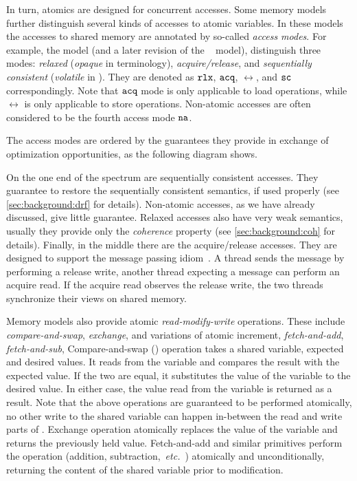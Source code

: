 In turn, atomics are designed for concurrent accesses. 
Some memory models further distinguish 
several kinds of accesses to atomic variables.
In these models the accesses to shared memory are annotated by 
so-called \emph{access modes}.
For example, the \CPP model (and a later revision of 
the \Java~\cite{Bender-Palsberg:OOPSLA19} model), distinguish 
three modes: \emph{relaxed} (\emph{opaque} in \Java terminology), 
\emph{acquire/release}, and \emph{sequentially consistent}
(\emph{volatile} in \Java).
They are denoted as $\mathtt{rlx}$, ${\mathtt{acq}}$, $\rel$, and ${\mathtt{sc}}$ correspondingly.
Note that ${\mathtt{acq}}$ mode is only applicable to load operations,
while $\rel$ is only applicable to store operations.
Non-atomic accesses are often considered to be the fourth access mode $\mathtt{na}$. 

The access modes are ordered by the guarantees they provide
in exchange of optimization opportunities, as the following 
diagram shows.




On the one end of the spectrum are sequentially consistent accesses. 
They guarantee to restore the sequentially consistent semantics, 
if used properly (see \cref{sec:background:drf} for details).
Non-atomic accesses, as we have already discussed, give little guarantee. 
Relaxed accesses also have very weak semantics, 
usually they provide only the \emph{coherence} property
(see \cref{sec:background:coh} for details).
Finally, in the middle there are the acquire/release accesses. 
They are designed to support the message passing idiom~\cite{Lahav-al:POPL16}.
A thread sends the message by performing a release write, 
another thread expecting a message can perform an acquire read. 
If the acquire read observes the release write, the two 
threads synchronize their views on shared memory. 

Memory models also provide atomic \emph{read-modify-write} operations.
These include \emph{compare-and-swap}, \emph{exchange}, and variations of atomic increment,
\eg \emph{fetch-and-add}, \emph{fetch-and-sub}, \etc 
Compare-and-swap (\CAS) operation takes a shared variable, expected 
and desired values. It reads from the variable
and compares the result with the expected value. If the two are equal,
it substitutes the value of the variable to the desired value. 
In either case, the value read from the variable is returned as a result. 
Note that the above operations are guaranteed to be performed atomically, 
no other write to the shared variable can happen in-between 
the read and write parts of \CAS.
Exchange operation atomically replaces the value 
of the variable and returns the previously held value.
Fetch-and-add and similar primitives perform 
the operation (addition, subtraction,~\emph{etc.}~)
atomically and unconditionally, returning 
the content of the shared variable prior to modification.

